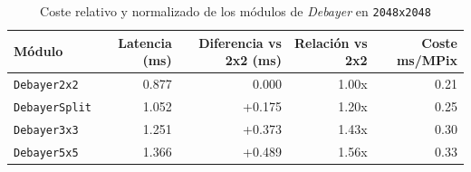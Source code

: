 \begin{table}[htbp]
\centering
\renewcommand{\arraystretch}{1.2}
\setlength{\tabcolsep}{6pt}
\begin{tabular}{|l|r|r|r|r|}
\hline
\rowcolor[gray]{0.90}
\textbf{Módulo} & \textbf{Latencia (ms)} & \textbf{Diferencia vs 2x2 (ms)} & \textbf{Relación vs 2x2} & \textbf{Coste ms/MPix} \\
\hline
\texttt{Debayer2x2} & 0.877 & 0.000 & 1.00x & 0.21 \\
\hline
\texttt{DebayerSplit} & 1.052 & +0.175 & 1.20x & 0.25 \\
\hline
\texttt{Debayer3x3} & 1.251 & +0.373 & 1.43x & 0.30 \\
\hline
\texttt{Debayer5x5} & 1.366 & +0.489 & 1.56x & 0.33 \\
\hline
\end{tabular}
\caption{Coste relativo y normalizado de los módulos de \textit{Debayer} en \texttt{2048x2048}}
\label{tab:debayer_2048_mpix_cost_equipo1_float32}
\end{table}
